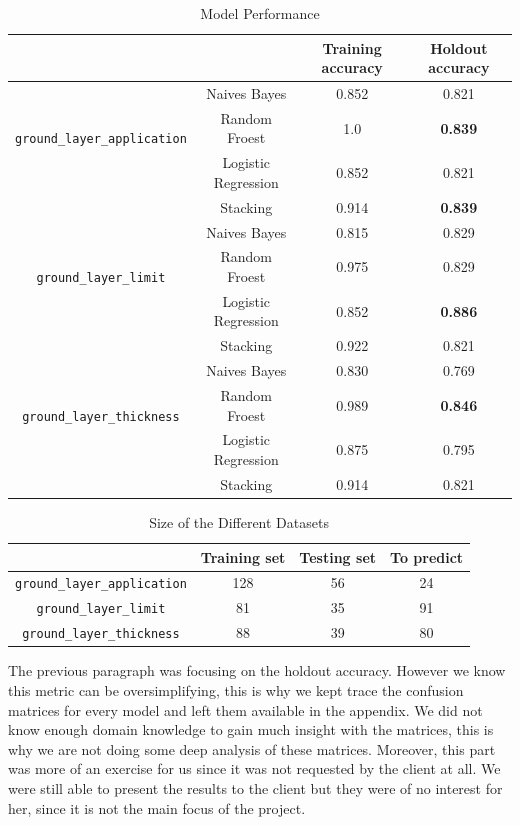 \documentclass[11pt, oneside]{article}
\begin{document}
\begin{table}[h]
\centering 
\begin{tabular}{c|c|c|c|}
     \multicolumn{2}{c}{} &  Training accuracy & Holdout accuracy \\
     \hline
     \multirow{3}{*}{\texttt{ground\_layer\_application}} & Naives Bayes & 0.852 & 0.821 \\
    \cline{2-4}
    & Random Froest & 1.0 & \textbf{0.839} \\
    \cline{2-4}
    & Logistic Regression & 0.852 & 0.821 \\
    \cline{2-4}
    & Stacking & 0.914 & \textbf{0.839}\\
    \hline
    \hline
    \multirow{3}{*}{\texttt{ground\_layer\_limit}} & Naives Bayes & 0.815 & 0.829 \\
    \cline{2-4}
    & Random Froest & 0.975 & 0.829 \\
    \cline{2-4}
    & Logistic Regression & 0.852 & \textbf{0.886} \\
    \cline{2-4}
    & Stacking & 0.922 & 0.821\\
    \hline
    \hline
    \multirow{3}{*}{\texttt{ground\_layer\_thickness}} & Naives Bayes & 0.830 & 0.769 \\
    \cline{2-4}
    & Random Froest & 0.989 & \textbf{0.846} \\
    \cline{2-4}
    & Logistic Regression & 0.875 & 0.795 \\
    \cline{2-4}
    & Stacking & 0.914 & 0.821\\
    \hline
\end{tabular}
\caption{Model Performance}
\label{Accuracies}
\end{table}


\begin{table}[h]
\centering 
\begin{tabular}{c|c|c|c|}
     & Training set & Testing set & To predict \\
     \hline
     \texttt{ground\_layer\_application}& 128 & 56 & 24\\
    \hline
    \texttt{ground\_layer\_limit}& 81 & 35 & 91\\
    \hline\texttt{ground\_layer\_thickness}& 88 & 39 & 80\\
    \hline
\end{tabular}
\caption{Size of the Different Datasets}
\label{table of counts}
\end{table}

\medbreak
\noindent The previous paragraph was focusing on the holdout accuracy. However we know this metric can be oversimplifying, this is why we kept trace the confusion matrices for every model and left them available in the appendix. We did not know enough domain knowledge to gain much insight with the matrices, this is why we are not doing some deep analysis of these matrices. Moreover, this part was more of an exercise for us since it was not requested by the client at all. We were still able to present the results to the client but they were of no interest for her, since it is not the main focus of the project.
\end{document}
